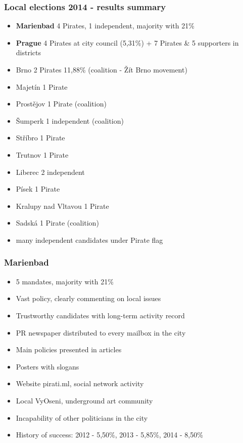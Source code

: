 \begin{frame}
\frametitle{Local elections 2014 - results summary}
\begin{itemize}
	\item \textbf{Marienbad} 4 Pirates, 1 independent, majority with 21\%
	\item \textbf{Prague} 4 Pirates at city council (5,31\%) + 7 Pirates \& 5 supporters in districts
	\item Brno 2 Pirates 11,88\% (coalition - \v{Z}\'it Brno movement)
	\item Majet\'in 1 Pirate
	\item Prost\v{e}jov 1 Pirate (coalition)
	\item \v{S}umperk 1 independent (coalition)
	\item St\v{r}\'ibro 1 Pirate
	\item Trutnov 1 Pirate
	\item Liberec 2 independent
	\item P\'isek 1 Pirate
	\item Kralupy nad Vltavou 1 Pirate
	\item Sadsk\'a 1 Pirate (coalition)
	\item many independent candidates under Pirate flag
\end{itemize}
\end{frame}
\begin{frame}
	\frametitle{Marienbad}
	\begin{itemize}
	\item 5 mandates, majority with 21\%
	\item Vast policy, clearly commenting on local issues
	\item Trustworthy candidates with long-term activity record
	\item PR newspaper distributed to every mailbox in the city
	\item Main policies presented in articles
	\item Posters with slogans
	\item Website pirati.ml, social network activity
	\item Local VyOseni, underground art community
	\item Incapability of other politicians in the city
	\item History of success: 2012 - 5,50\%, 2013 - 5,85\%, 2014 - 8,50\%
	\end{itemize}
\end{frame}
